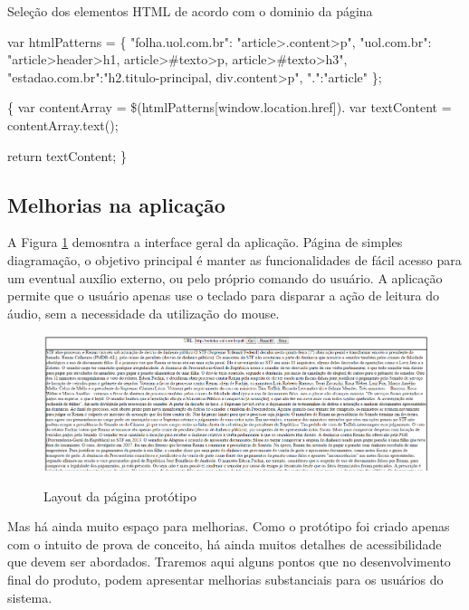 \documentclass[
	12pt,				%
	oneside,			%
	a4paper,			%
	english,			%
	brazil				%
	]{abntex2ppgsi}
\begin{document}
\begin{algorithm}[htbp]
\caption{Seleção dos elementos HTML de acordo com o dominio da página}
	\label{alg:algoritmo-exemplo4}
	\begin{algorithmic}
		\State var htmlPatterns = \{
		\State	"folha.uol.com.br": "article\textgreater .content\textgreater p",
		\State	"uol.com.br": "article\textgreater header\textgreater h1, article\textgreater\#texto\textgreater p, article\textgreater\#texto\textgreater h3",
		\State	"estadao.com.br":"h2.titulo-principal, div.content\textgreater p",
		\State	".":"article"
		\State \}; 
	
		 \{
		\State var contentArray = \$(htmlPatterns[window.location.href]).
		\State var textContent = contentArray.text();
		
		\Return return textContent;
		\EndFunction
		\}
	\end{algorithmic}
\end{algorithm}


\subsection{Melhorias na aplicação}

A Figura \ref{fig:figura-interface} demosntra a interface geral da aplicação. Página de simples diagramação, o objetivo principal é manter as funcionalidades de fácil acesso para um eventual auxílio externo, ou pelo próprio comando do usuário. A aplicação permite que o usuário apenas use o teclado para disparar a ação de leitura do áudio, sem a necessidade da utilização do mouse.

\begin{figure}[htbp]
	\centering
	\caption{Layout da página protótipo}
	\includegraphics[scale=0.4]{figura-interface.png}
	\label{fig:figura-interface}
	
\end{figure}

Mas há ainda muito espaço para melhorias. Como o protótipo foi criado apenas com o intuito de prova de conceito, há ainda muitos detalhes de acessibilidade que devem ser abordados. Traremos aqui alguns pontos que no desenvolvimento final do produto, podem apresentar melhorias substanciais para os usuários do sistema.
\end{document}
